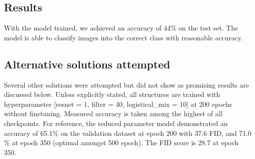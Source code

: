 \documentclass{article}
\begin{document}
\subsection{Results}
With the model trained, we achieved an accuracy of 44\% on the test set. The model is able to classify images into the correct class with reasonable accuracy.

\subsection{Alternative solutions attempted}
\label{alternative_solution}

Several other solutions were attempted but did not show as promising results are discussed below. Unless explicitly stated, all structures are trained with hyperparameter [resnet = 1, filter = 40, logistical\_mix = 10] at 200 epochs without finetuning. Measured accuracy is taken among the highest of all checkpoints. For reference, the reduced parameter model demonstrated an accuracy of 65.1\% on the validation dataset at epoch 200 with 37.6 FID, and 71.0 \% at epoch 350 (optimal amongst 500 epoch). The FID score is 28.7 at epoch 350.
\end{document}
